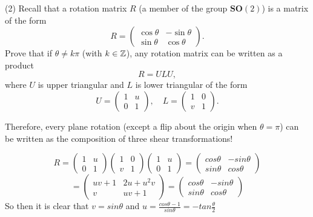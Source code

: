 \documentclass[12pt]{article}
\begin{document}
\medskip
(2)
Recall that a rotation matrix $R$ (a member of the group
$\mathbf{SO}(2)$)  is a matrix of the form
\[
R = 
\begin{pmatrix}
\cos\theta & -\sin\theta \\
\sin\theta & \cos\theta
\end{pmatrix}.
\]
Prove that if $\theta \not= k \pi$ (with $k \in {\mathbb Z}$), 
any rotation matrix can be written as a product 
\[
R = U L U,
\] 
where $U$ is upper triangular and $L$ is lower triangular 
of the form
\[
U = 
\begin{pmatrix}
1 & u \\
0 & 1
\end{pmatrix},
\quad
L = 
\begin{pmatrix}
1 & 0 \\
v & 1
\end{pmatrix}.
\]

\medskip
Therefore, every plane rotation (except a flip about the origin when 
$\theta = \pi$) can be written as the composition of three
shear transformations!

$$R = \begin{pmatrix}
1 & u \\ 0 & 1
\end{pmatrix} \begin{pmatrix}
1 & 0 \\ v & 1
\end{pmatrix}\begin{pmatrix}
1 & u \\ 0 & 1
\end{pmatrix} = \begin{pmatrix}
cos \theta & -sin \theta \\ sin \theta & cos \theta
\end{pmatrix}$$
$$ = \begin{pmatrix}
uv +1 & 2u + u^2v \\ v & uv +1
\end{pmatrix}= \begin{pmatrix}
cos \theta & -sin \theta \\ sin \theta & cos \theta
\end{pmatrix}$$
So then it is clear that $v = sin\theta$ and $u = \frac{cos\theta - 1}{sin \theta} = -tan \frac{\theta}{2}$
\end{document}
